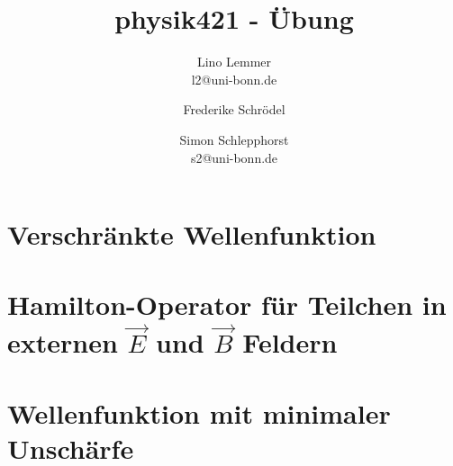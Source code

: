 

\setcounter{thezettel}{7}
\renewcommand\thesection{\arabic{thezettel}.\arabic{section}}

\newcommand\ccancel[2][black]{\renewcommand\CancelColor{\color{#1}}\cancel{#2}}


\title{physik421 - Übung }
\author{Lino Lemmer \\ \small{l2@uni-bonn.de} \and Frederike Schrödel \and Simon Schlepphorst\\ \small{s2@uni-bonn.de}}


\maketitle

\section{Verschränkte Wellenfunktion}

\section{Hamilton-Operator für Teilchen in externen $\vec E$ und $\vec B$ Feldern}

\section{Wellenfunktion mit minimaler Unschärfe}


